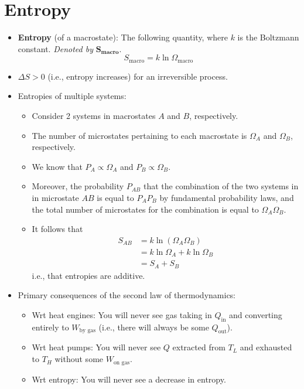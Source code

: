 \documentclass[../notes.tex]{subfiles}
\begin{document}
\section{Entropy}
\begin{itemize}
    \item {}\textbf{Entropy} (of a macrostate): The following quantity, where $k$ is the Boltzmann constant. \emph{Denoted by} $\bm{S_\textbf{macro}}$.
    \begin{equation*}
        S_\text{macro} = k\ln\Omega_\text{macro}
    \end{equation*}
    \item $\Delta S>0$ (i.e., entropy increases) for an irreversible process.
    \item Entropies of multiple systems:
    \begin{itemize}
        \item Consider 2 systems in macrostates $A$ and $B$, respectively.
        \item The number of microstates pertaining to each macrostate is $\Omega_A$ and $\Omega_B$, respectively.
        \item We know that $P_A\propto\Omega_A$ and $P_B\propto\Omega_B$.
        \item Moreover, the probability $P_{AB}$ that the combination of the two systems in in microstate $AB$ is equal to $P_AP_B$ by fundamental probability laws, and the total number of microstates for the combination is equal to $\Omega_A\Omega_B$.
        \item It follows that
        \begin{align*}
            S_{AB} &= k\ln(\Omega_A\Omega_B)\\
            &= k\ln\Omega_A+k\ln\Omega_B\\
            &= S_A+S_B
        \end{align*}
        i.e., that entropies are additive.
    \end{itemize}
    \item Primary consequences of the second law of thermodynamics:
    \begin{itemize}
        \item Wrt heat engines: You will never see gas taking in $Q_\text{in}$ and converting entirely to $W_\text{by gas}$ (i.e., there will always be some $Q_\text{out}$).
        \item Wrt heat pumps: You will never see $Q$ extracted from $T_L$ and exhausted to $T_H$ without some $W_\text{on gas}$.
        \item Wrt entropy: You will never see a decrease in entropy.

\end{itemize}
\end{itemize}
\end{document}
